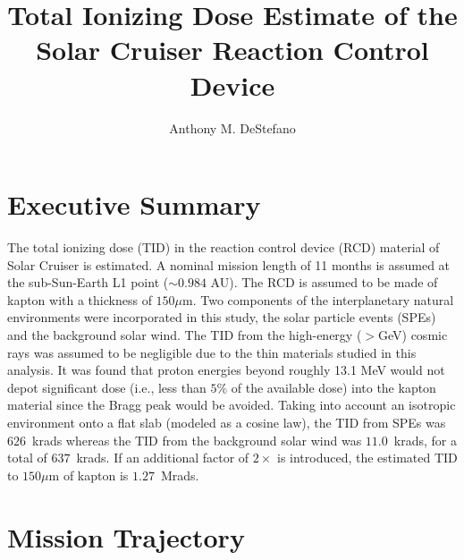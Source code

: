 \documentclass{hitec}
\title{Total Ionizing Dose Estimate of the Solar Cruiser Reaction Control Device}
\author{Anthony M. DeStefano}
\begin{document}
\maketitle
{}

\tableofcontents
\listoffigures
\listoftables
\lstlistoflistings
\newpage






\cleardoublepage
{}
\section{Executive Summary}

The total ionizing dose (TID) in the reaction control device (RCD) material of Solar Cruiser is estimated. A nominal mission length of 11 months is assumed at the sub-Sun-Earth L1 point ($\sim 0.984$ AU). The RCD is assumed to be made of kapton with a thickness of $150\mu$m. Two components of the interplanetary natural environments were incorporated in this study, the solar particle events (SPEs) and the background solar wind. The TID from the high-energy ($>$GeV) cosmic rays was assumed to be negligible due to the thin materials studied in this analysis. It was found that proton energies beyond roughly 13.1 MeV would not depot significant dose (i.e., less than $5\%$ of the available dose) into the kapton material since the Bragg peak would be avoided. Taking into account an isotropic environment onto a flat slab (modeled as a cosine law), the TID from SPEs was $626$~krads whereas the TID from the background solar wind was $11.0$~krads, for a total of $637$~krads. If an additional factor of $2\times$ is introduced, the estimated TID to $150\mu$m of kapton is $1.27$~Mrads.



\newpage
\section{Mission Trajectory}
\end{document}
